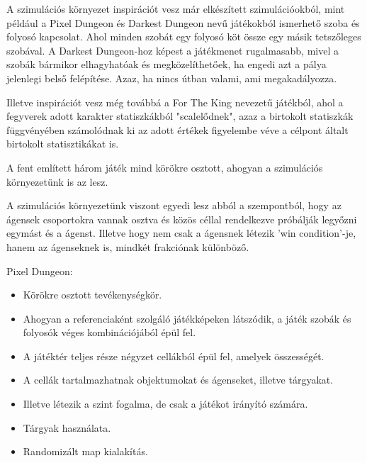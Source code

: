 

A szimulációs környezet inspirációt vesz már elkészített szimulációokból, mint például a Pixel Dungeon és Darkest Dungeon
nevű játékokból ismerhető szoba és folyosó kapcsolat. Ahol minden szobát egy folyosó köt össze egy másik tetszőleges szobával.
A Darkest Dungeon-hoz képest a játékmenet rugalmasabb, mivel a szobák bármikor elhagyhatóak és megközelíthetőek, ha engedi azt a pálya jelenlegi belső felépítése.
Azaz, ha nincs útban valami, ami megakadályozza.

Illetve inspirációt vesz még továbbá a For The King nevezetű játékból, ahol a fegyverek adott karakter statiszkákból "scalelődnek", azaz a birtokolt statiszkák függvényében
számolódnak ki az adott értékek figyelembe véve a célpont általt birtokolt statisztikákat is.

A fent említett három játék mind körökre osztott, ahogyan a szimulációs környezetünk is az lesz.

A szimulációs környezetünk viszont egyedi lesz abból a szempontból, hogy az ágensek csoportokra vannak osztva és közös céllal rendelkezve próbálják legyőzni egymást és a ágenst.
Illetve hogy nem csak a ágensnek létezik 'win condition'-je, hanem az ágenseknek is, mindkét frakciónak különböző.

\noindent Pixel Dungeon:

\begin{itemize}
    \item Körökre osztott tevékenységkör.
    \item Ahogyan a referenciaként szolgáló játékképeken látszódik, a játék szobák és folyosók véges kombinációjából épül fel.
    \item A játéktér teljes része négyzet cellákból épül fel, amelyek összességét.
    \item A cellák tartalmazhatnak objektumokat és ágenseket, illetve tárgyakat.
    \item Illetve létezik a szint fogalma, de csak a játékot irányító számára.
    \item Tárgyak használata.
    \item Randomizált map kialakítás.
\end{itemize}

